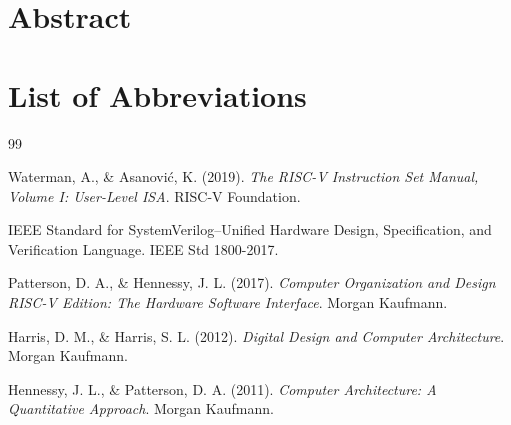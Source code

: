 \documentclass[12pt,a4paper,oneside]{report}
\begin{document}



\chapter*{Abstract}


\tableofcontents
\cleardoublepage

\listoffigures
\cleardoublepage

\listoftables
\cleardoublepage

\chapter*{List of Abbreviations}


\cleardoublepage
{}









\begin{thebibliography}{99}

Waterman, A., \& Asanović, K. (2019). \textit{The RISC-V Instruction Set Manual, Volume I: User-Level ISA}. RISC-V Foundation.

IEEE Standard for SystemVerilog--Unified Hardware Design, Specification, and Verification Language. IEEE Std 1800-2017.

Patterson, D. A., \& Hennessy, J. L. (2017). \textit{Computer Organization and Design RISC-V Edition: The Hardware Software Interface}. Morgan Kaufmann.

Harris, D. M., \& Harris, S. L. (2012). \textit{Digital Design and Computer Architecture}. Morgan Kaufmann.

Hennessy, J. L., \& Patterson, D. A. (2011). \textit{Computer Architecture: A Quantitative Approach}. Morgan Kaufmann.

\end{thebibliography}

\appendix

\end{document}
